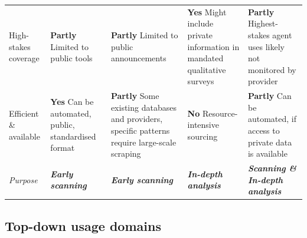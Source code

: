 \documentclass[manuscript,screen,nonacm,oneside]{acmart}
\begin{document}
\begin{table}[htbp]
{\begin{tabular}{>{\raggedright\arraybackslash}p{2.2cm}>{\raggedright\arraybackslash}p{3.2cm}>{\raggedright\arraybackslash}p{3.2cm}>{\raggedright\arraybackslash}p{3.2cm}>{\raggedright\arraybackslash}p{3.2cm}}
High-stakes coverage & \textbf{Partly} Limited to public tools & \textbf{Partly} Limited to public announcements & \textbf{Yes} Might include private information in mandated qualitative surveys & \textbf{Partly} Highest-stakes agent uses likely not monitored by provider \\
Efficient \& available & \textbf{Yes} Can be automated, public, standardised format & \textbf{Partly} Some existing databases and providers, specific patterns require large-scale scraping & \textbf{No} Resource-intensive sourcing & \textbf{Partly} Can be automated, if access to private data is available \\
\midrule
\emph{Purpose} & \emph{\textbf{Early scanning}} & \emph{\textbf{Early scanning}} & \emph{\textbf{In-depth analysis}} & \emph{\textbf{Scanning \& In-depth analysis}} \\
\bottomrule
\end{tabular}%
}
\end{table}

\subsection{Top-down usage domains}
\label{app:topdown-domains}
\end{document}

